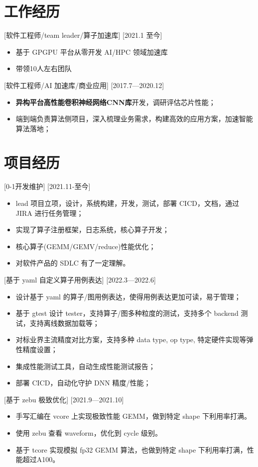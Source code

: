\documentclass{resume}
\begin{document}
\section{工作经历}

[软件工程师/team leader/算子加速库]
[2021.1 至今]

\begin{itemize}
  \item 基于 GPGPU 平台从零开发 AI/HPC 领域加速库
  \item 带领10人左右团队
\end{itemize}

[软件工程师/AI 加速库/商业应用]
[2017.7—2020.12] 

\begin{itemize}
  \item \textbf{异构平台高性能卷积神经网络CNN库}开发，调研评估芯片性能；
  \item 端到端负责算法侧项目，深入梳理业务需求，构建高效的应用方案，加速智能算法落地；
\end{itemize}

\section{项目经历}

[0-1开发维护]
[2021.11-至今]
\begin{itemize}
  \item lead 项目立项，设计，系统构建，开发，测试，部署 CICD，文档，通过 JIRA 进行任务管理；
  \item 实现了算子注册框架，日志系统，核心算子开发；
  \item 核心算子(GEMM/GEMV/reduce)性能优化；
  \item 对软件产品的 SDLC 有了一定理解。
\end{itemize}


[基于 yaml 自定义算子用例表达]
[2022.3—2022.6]

\begin{itemize}
  \item 设计基于 yaml 的算子/图用例表达，使得用例表达更加可读，易于管理；
  \item 基于 gtest 设计 tester，支持算子/图多种粒度的测试，支持多个 backend 测试，支持离线数据加载等；
  \item 对标业界主流精度对比方案，支持多种 data type, op type, 特定硬件实现等弹性精度设置；
  \item 集成性能测试工具，自动生成性能测试报告；
  \item 部署 CICD，自动化守护 DNN 精度/性能；
\end{itemize}


[基于 zebu 极致优化]
[2021.9—2021.10]

\begin{itemize}
  \item 手写汇编在 vcore 上实现极致性能 GEMM，做到特定 shape 下利用率打满。
  \item 使用 zebu 查看 waveform，优化到 cycle 级别。
  \item 基于 tcore 实现模拟 fp32 GEMM 算法，也做到特定 shape 下利用率打满，性能超过A100。
\end{itemize}
\end{document}
